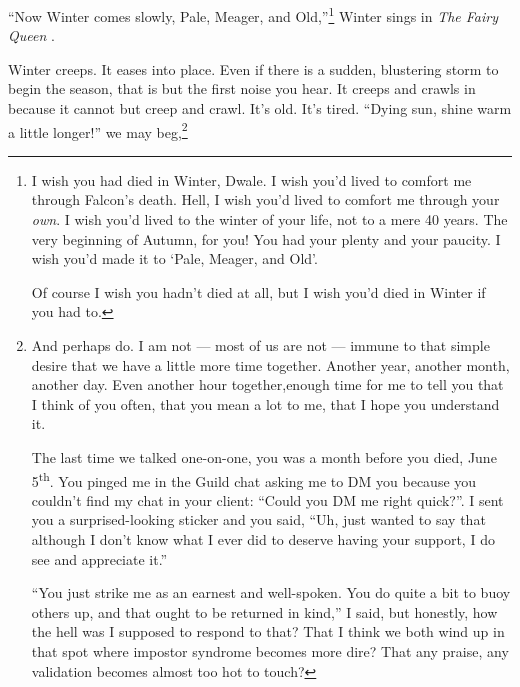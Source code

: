 \documentclass[12pt,oneside]{memoir}
\begin{document}
``Now Winter comes slowly, Pale, Meager, and Old,''\footnote{I wish you had died in Winter, Dwale. I wish you'd lived to comfort me through Falcon's death. Hell, I wish you'd lived to comfort me through your \emph{own}. I wish you'd lived to the winter of your life, not to a mere 40 years. The very beginning of Autumn, for you! You had your plenty and your paucity. I wish you'd made it to `Pale, Meager, and Old'.\par Of course I wish you hadn't died at all, but I wish you'd died in Winter if you had to.} Winter sings in \emph{The Fairy Queen} \parencite{purcell}.

Winter creeps. It eases into place. Even if there is a sudden, blustering storm to begin the season, that is but the first noise you hear. It creeps and crawls in because it cannot but creep and crawl. It's old. It's tired. ``Dying sun, shine warm a little longer!'' \parencite[206]{graves_poems} we may beg,\footnote{And perhaps do. I am not --- most of us are not --- immune to that simple desire that we have a little more time together. Another year, another month, another day. Even another hour together,\footnotemark enough time for me to tell you that I think of you often, that you mean a lot to me, that I hope you understand it.\par 
The last time we talked one-on-one, you was a month before you died, June 5\textsuperscript{th}. You pinged me in the Guild chat asking me to DM you because you couldn't find my chat in your client: ``Could you DM me right quick?''. I sent you a surprised-looking sticker and you said, ``Uh, just wanted to say that although I don't know what I ever did to deserve having your support, I do see and appreciate it.''\par 
``You just strike me as an earnest and well-spoken. You do quite a bit to buoy others up, and that ought to be returned in kind,'' I said, but honestly, how the hell was I supposed to respond to that? That I think we both wind up in that spot where impostor syndrome becomes more dire? That any praise, any validation becomes almost too hot to touch?\par 
}
\end{document}
